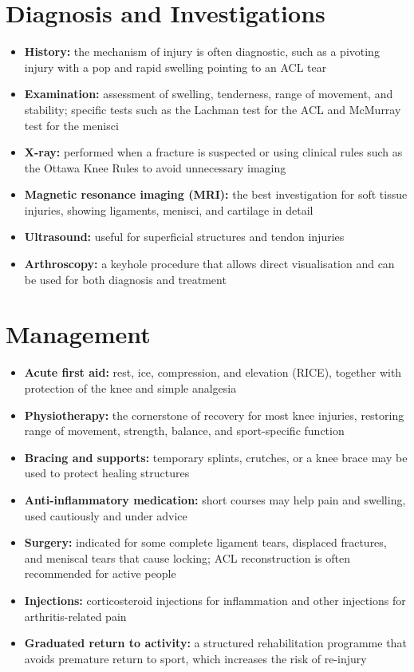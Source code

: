 \section*{Diagnosis and Investigations}
\begin{itemize}
    \item \textbf{History:} the mechanism of injury is often diagnostic, such as a pivoting injury with a pop and rapid swelling pointing to an ACL tear
    \item \textbf{Examination:} assessment of swelling, tenderness, range of movement, and stability; specific tests such as the Lachman test for the ACL and McMurray test for the menisci
    \item \textbf{X-ray:} performed when a fracture is suspected or using clinical rules such as the Ottawa Knee Rules to avoid unnecessary imaging
    \item \textbf{Magnetic resonance imaging (MRI):} the best investigation for soft tissue injuries, showing ligaments, menisci, and cartilage in detail
    \item \textbf{Ultrasound:} useful for superficial structures and tendon injuries
    \item \textbf{Arthroscopy:} a keyhole procedure that allows direct visualisation and can be used for both diagnosis and treatment
\end{itemize}

\section*{Management}
\begin{itemize}
    \item \textbf{Acute first aid:} rest, ice, compression, and elevation (RICE), together with protection of the knee and simple analgesia
    \item \textbf{Physiotherapy:} the cornerstone of recovery for most knee injuries, restoring range of movement, strength, balance, and sport-specific function
    \item \textbf{Bracing and supports:} temporary splints, crutches, or a knee brace may be used to protect healing structures
    \item \textbf{Anti-inflammatory medication:} short courses may help pain and swelling, used cautiously and under advice
    \item \textbf{Surgery:} indicated for some complete ligament tears, displaced fractures, and meniscal tears that cause locking; ACL reconstruction is often recommended for active people
    \item \textbf{Injections:} corticosteroid injections for inflammation and other injections for arthritis-related pain
    \item \textbf{Graduated return to activity:} a structured rehabilitation programme that avoids premature return to sport, which increases the risk of re-injury
\end{itemize}


